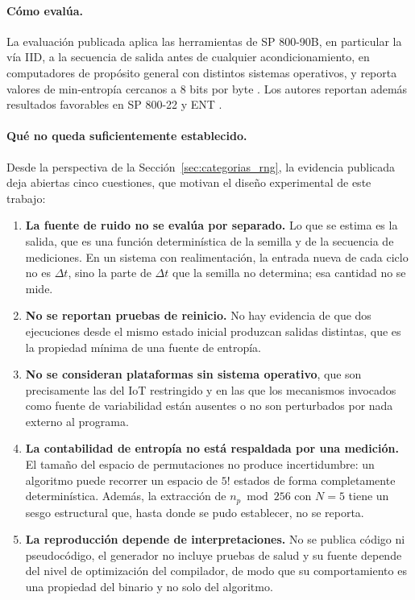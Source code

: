 \paragraph{Cómo evalúa.} La evaluación publicada aplica las herramientas de SP 800-90B, en particular la vía IID, a la secuencia de salida antes de cualquier acondicionamiento, en computadores de propósito general con distintos sistemas operativos, y reporta valores de min-entropía cercanos a 8 bits por byte \cite{Vrana2025RawEvaluation}. Los autores reportan además resultados favorables en SP 800-22 y ENT \cite{Kuang2025IID-BasedJitter,Vrana2025RawEvaluation}.

\paragraph{Qué no queda suficientemente establecido.} Desde la perspectiva de la Sección~\ref{sec:categorias_rng}, la evidencia publicada deja abiertas cinco cuestiones, que motivan el diseño experimental de este trabajo:
\begin{enumerate}
    \item \textbf{La fuente de ruido no se evalúa por separado.} Lo que se estima es la salida, que es una función determinística de la semilla y de la secuencia de mediciones. En un sistema con realimentación, la entrada nueva de cada ciclo no es $\Delta t$, sino la parte de $\Delta t$ que la semilla no determina; esa cantidad no se mide.
    \item \textbf{No se reportan pruebas de reinicio.} No hay evidencia de que dos ejecuciones desde el mismo estado inicial produzcan salidas distintas, que es la propiedad mínima de una fuente de entropía.
    \item \textbf{No se consideran plataformas sin sistema operativo}, que son precisamente las del IoT restringido y en las que los mecanismos invocados como fuente de variabilidad están ausentes o no son perturbados por nada externo al programa.
    \item \textbf{La contabilidad de entropía no está respaldada por una medición.} El tamaño del espacio de permutaciones no produce incertidumbre: un algoritmo puede recorrer un espacio de $5!$ estados de forma completamente determinística. Además, la extracción de $n_p \bmod 256$ con $N = 5$ tiene un sesgo estructural que, hasta donde se pudo establecer, no se reporta.
    \item \textbf{La reproducción depende de interpretaciones.} No se publica código ni pseudocódigo, el generador no incluye pruebas de salud y su fuente depende del nivel de optimización del compilador, de modo que su comportamiento es una propiedad del binario y no solo del algoritmo.
\end{enumerate}


